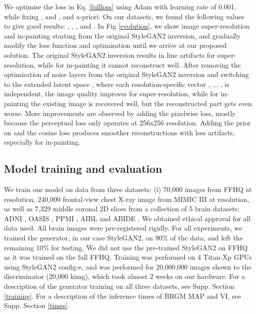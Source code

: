 \documentclass{article}
\newcommand{\wplus}{ }
\begin{document}
We optimise the loss in Eq. \ref{fullloss} using Adam \cite{kingma2014adam} with learning rate of 0.001, while fixing ,  and ,  and  a-priori. On our datasets, we found the following values to give good results: , , ,  and . In Fig \ref{evolution}, we show image super-resolution and in-painting starting from the original StyleGAN2 inversion, and gradually modify the loss function and optimisation until we arrive at our proposed solution. The original StyleGAN2 inversion results in line artifacts for super-resolution, while for in-painting it cannot reconstruct well. After removing the optimisation of noise layers from the original StyleGAN2 inversion\cite{karras2020analyzing} and switching to the extended latent space \wplus, where each resolution-specific vector , ... ,  is independent, the image quality improves for super-resolution, while for in-painting the existing image is recovered well, but the reconstructed part gets even worse. More improvements are observed by adding the pixelwise  loss, mostly because the perceptual loss only operates at 256x256 resolution. Adding the prior on  and the cosine loss produces smoother reconstructions with less artifacts, especially for in-painting. 


 
\subsection{Model training and evaluation}
\label{trainingmain}

We train our model on data from three datasets: (i) 70,000 images from FFHQ \cite{karras2019style} at  resolution, 240,000 frontal-view chest X-ray image from MIMIC III \cite{johnson2016mimic} at  resolution, as well as 7,329 middle coronal 2D slices from a collection of 5 brain datasets: ADNI \cite{jack2008alzheimer}, OASIS \cite{marcus2010open}, PPMI \cite{marek2018parkinson}, AIBL \cite{ellis2009australian} and ABIDE \cite{heinsfeld2018identification}. We obtained ethical approval for all data used. All brain images were pre-registered rigidly. For all experiments, we trained the generator, in our case StyleGAN2, on 90\% of the data, and left the remaining 10\% for testing. We did not use the pre-trained StyleGAN2 on FFHQ as it was trained on the full FFHQ. Training was performed on 4 Titan-Xp GPUs using StyleGAN2 config-e, and was performed for 20,000,000 images shown to the discriminator (20,000 kimg), which took almost 2 weeks on our hardware. For a description of the generator training on all three datasets, see Supp. Section \ref{training}. For a description of the inference times of BRGM MAP and VI, see Supp. Section \ref{times}.
\end{document}
